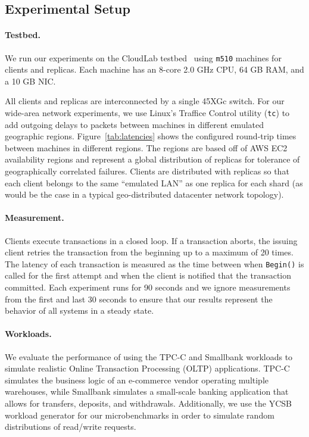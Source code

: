 \subsection{Experimental Setup}
\paragraph{Testbed.} We run our experiments on the CloudLab
testbed~\cite{cloudlab} using \texttt{m510} machines for clients and replicas.
Each machine has an 8-core 2.0 GHz CPU, 64 GB RAM, and a 10 GB NIC.

All clients and replicas are interconnected by a single 45XGc switch. For our
wide-area network experiments, we use Linux's Traffice Control utility (\texttt{tc})
to add outgoing delays to packets between machines in different emulated
geographic regions. Figure~\ref{tab:latencies} shows the configured round-trip
times between machines in different regions. The regions are based off of AWS
EC2 availability regions and represent a global distribution of replicas for
tolerance of geographically correlated failures. Clients are distributed with
replicas so that each client belongs to the same ``emulated LAN'' as one replica
for each shard (as would be the case in a typical geo-distributed datacenter
network topology).

\paragraph{Measurement.} Clients execute transactions in a closed loop. If a
transaction aborts, the issuing client retries the transaction from the
beginning up to a maximum of 20 times. The latency of each transaction is 
measured as the time between when \texttt{Begin()} is called for the first
attempt and when the client is notified that the transaction committed. Each
experiment runs for 90 seconds and we ignore measurements from the first and
last 30 seconds to ensure that our results represent the behavior of all systems
in a steady state.

\paragraph{Workloads.} We evaluate the performance of \sys using the TPC-C and Smallbank workloads to simulate realistic Online Transaction Processing (OLTP) applications. TPC-C simulates the business logic of an e-commerce vendor operating multiple warehouses, while Smallbank simulates a small-scale banking application that allows for transfers, deposits, and withdrawals. Additionally, we use the YCSB workload generator for our microbenchmarks in order to simulate random distributions of read/write requests.


